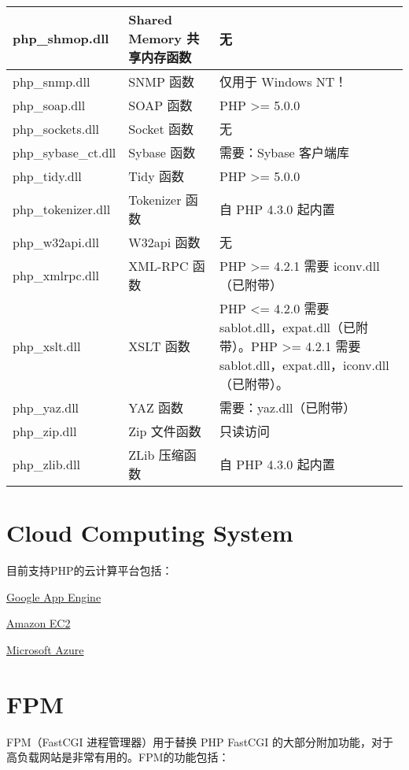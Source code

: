 \begin{longtable}{|m{60pt}|m{130pt}|m{200pt}|}
\hline
php\_shmop.dll			&Shared Memory 共享内存函数	&无\\
\hline
php\_snmp.dll			&SNMP 函数	&仅用于 Windows NT！\\
\hline
php\_soap.dll			&SOAP 函数	&PHP >= 5.0.0\\
\hline
php\_sockets.dll			&Socket 函数	&无\\
\hline
php\_sybase\_ct.dll		&Sybase 函数	&需要：Sybase 客户端库\\
\hline
php\_tidy.dll				&Tidy 函数	&PHP >= 5.0.0\\
\hline
php\_tokenizer.dll		&Tokenizer 函数	&自 PHP 4.3.0 起内置\\
\hline
php\_w32api.dll			&W32api 函数	&无\\
\hline
php\_xmlrpc.dll			&XML-RPC 函数	&PHP >= 4.2.1 需要 iconv.dll（已附带）\\
\hline
php\_xslt.dll				&XSLT 函数	&PHP <= 4.2.0 需要 sablot.dll，expat.dll（已附带）。PHP >= 4.2.1 需要 sablot.dll，expat.dll，iconv.dll（已附带）。\\
\hline
php\_yaz.dll				&YAZ 函数	&需要：yaz.dll（已附带）\\
\hline
php\_zip.dll				&Zip 文件函数	&只读访问\\
\hline
php\_zlib.dll				&ZLib 压缩函数	&自 PHP 4.3.0 起内置\\
\hline
\end{longtable}


\section{Cloud Computing System}

目前支持PHP的云计算平台包括：

\begin{compactitem}
\item \href{https://developers.google.com/appengine/}{Google App Engine}
\item \href{http://aws.amazon.com/sdkforphp/}{Amazon EC2}
\item \href{http://www.interoperabilitybridges.com/projects/php-sdk-for-windows-azure.aspx}{Microsoft Azure}
\end{compactitem}



\section{FPM}

FPM（FastCGI 进程管理器）用于替换 PHP FastCGI 的大部分附加功能，对于高负载网站是非常有用的。FPM的功能包括：

